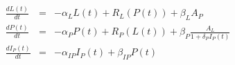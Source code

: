 
\begin{eqnarray}
  \frac{dL(t)}{dt} &=& -\alpha_{L}L(t) + R_{L}(P(t)) + \beta_{L}A_{P} \\
  \frac{dP(t)}{dt} &=& -\alpha_{P}P(t) + R_{P}(L(t)) + \beta_{P}\frac{A_{L}}{1+\delta_{P}I_{P}(t)} \\
  \frac{dI_{P}(t)}{dt} &=& -\alpha_{IP}I_{P}(t) + \beta_{IP}P(t)
\end{eqnarray}
